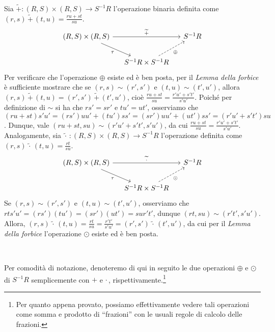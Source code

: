 \noindent Sia $\widetilde{+}\colon (R,S)\times (R,S)\to S^{-1}R$ l'operazione binaria definita come $(r,s)\,\widetilde{+}\,(t,u)=\frac{ru+st}{su}$.
\[
	\begin{tikzcd}[column sep=small]
{(R,S)\times(R,S)} \arrow[rd, "\tau"'] \arrow[rr, "\widetilde{+}"] &                                                     & S^{-1}R \\
                                                                   & S^{-1}R\times S^{-1}R \arrow[ru, "\oplus"', dashed] &        
\end{tikzcd}
\]
Per verificare che l'operazione $\oplus$ esiste ed è ben posta, per il \emph{Lemma della forbice} è sufficiente mostrare che se $(r,s)\sim (r',s')$ e $(t,u)\sim (t',u')$, allora $(r,s)\,\widetilde{+}\,(t,u)=(r',s')\,\widetilde{+}\,(t',u')$, cioè $\frac{ru+st}{su}=\frac{r'u'+s't'}{s'u'}$. Poiché per definizione di $\sim$ si ha che $rs'=sr'$ e $tu'=ut'$, osserviamo che $(ru+st)s'u'=(rs')uu'+(tu')ss'=(sr')uu'+(ut')ss'=(r'u'+s't')su$. Dunque, vale $(ru+st,su)\sim (r'u'+s't',s'u')$, da cui $\frac{ru+st}{su}=\frac{r'u'+s't'}{s'u'}$. \clearpage
\noindent Analogamente, sia $\widetilde{\cdot}\,\colon (R,S)\times (R,S)\to S^{-1}R$ l'operazione definita come $(r,s)\,\widetilde{\cdot}\,(t,u)=\frac{rt}{su}$.
\[
	\begin{tikzcd}[column sep=small]
{(R,S)\times(R,S)} \arrow[rd, "\tau"'] \arrow[rr, "\widetilde{\cdot}"] &                                                    & S^{-1}R \\
                                                                       & S^{-1}R\times S^{-1}R \arrow[ru, "\odot"', dashed] &        
\end{tikzcd}
\]
Se $(r,s)\sim (r',s')$ e $(t,u)\sim (t',u')$, osserviamo che $rts'u'=(rs')(tu')=(sr')(ut')=sur't'$, dunque $(rt,su)\sim(r't',s'u')$. Allora, $(r,s)\,\widetilde{\cdot}\,(t,u)=\frac{rt}{su}=\frac{r't'}{s'u'}=(r',s')\,\widetilde{\cdot}\,(t',u')$, da cui per il \emph{Lemma della forbice} l'operazione $\odot$ esiste ed è ben posta.

\

\vspace{-2mm}

\noindent Per comodità di notazione, denoteremo di qui in seguito le due operazioni $\oplus$ e $\odot$ di $S^{-1}R$ semplicemente con $+$ e $\cdot$\,, rispettivamente.\footnote{Per quanto appena provato, possiamo effettivamente vedere tali operazioni come somma e prodotto di ``frazioni'' con le usuali regole di calcolo delle frazioni.}


